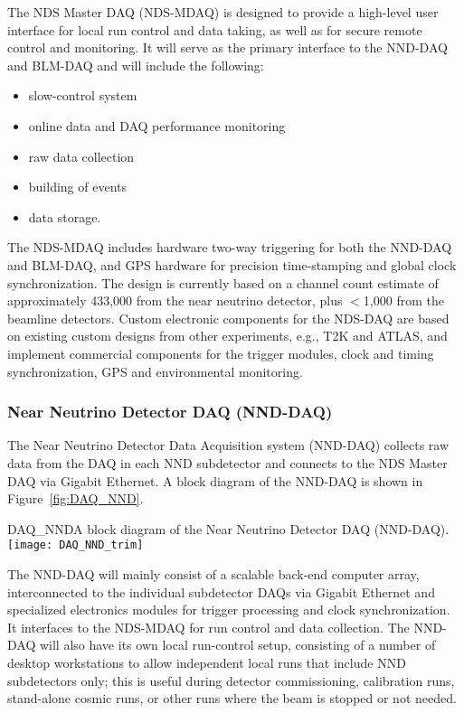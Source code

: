 The NDS Master DAQ (NDS-MDAQ) is designed to provide a high-level user
interface for local run control and data taking, as well as for secure
remote control and monitoring.  It will serve as the primary interface
to the NND-DAQ and BLM-DAQ and will include the following:
\begin{itemize}
\item slow-control system 
\item online data and DAQ performance monitoring  
\item raw data collection
\item building of events
\item data storage.   
\end{itemize}
The NDS-MDAQ includes hardware two-way triggering for both the NND-DAQ
and BLM-DAQ, and GPS hardware for precision time-stamping and global
clock synchronization.  The design is currently based on a channel
count estimate of approximately 433,000 from the near neutrino
detector, plus $<$1,000 from the beamline detectors.  Custom
electronic components for the NDS-DAQ are based on existing custom
designs from other experiments, e.g., T2K and ATLAS, and implement
commercial components for the trigger modules, clock and timing
synchronization, GPS and environmental monitoring.


\subsubsection{Near Neutrino Detector DAQ (NND-DAQ)} 
\label{cdrsec:nd:nnd:daq}


The Near Neutrino Detector Data Acquisition system (NND-DAQ) collects
raw data from the DAQ in each NND subdetector and connects to the NDS
Master DAQ via Gigabit Ethernet. A block diagram of the NND-DAQ is
shown in Figure~\ref{fig:DAQ_NND}. 
\begin{cdrfigure}
{DAQ_NND}{A block diagram of the Near Neutrino Detector DAQ (NND-DAQ).}
\texttt{[image: DAQ\_NND\_trim]}
\end{cdrfigure}
The NND-DAQ will mainly consist of a scalable back-end computer array,
interconnected to the individual subdetector DAQs via Gigabit
Ethernet and specialized electronics modules for trigger processing
and clock synchronization. It interfaces to the NDS-MDAQ for run
control and data collection. The NND-DAQ will also have its own local
run-control setup, consisting of a number of desktop workstations to
allow independent local runs that include NND subdetectors only; this
is useful during detector commissioning, calibration runs, stand-alone
cosmic runs, or other runs where the beam is stopped or not needed.


